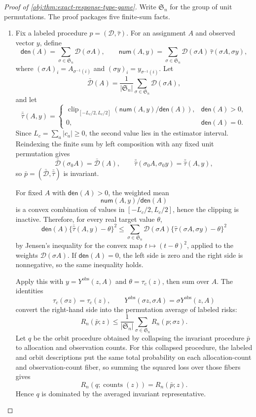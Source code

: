 \begin{proof}[Proof of \cref{obj:thm:exact-response-type-game}]
Write \(\mathfrak S_n\) for the group of unit permutations.  The proof packages five finite-sum facts.

\begin{enumerate}
\item Fix a labeled procedure \(p=(\mathcal D,\widehat\tau)\).  For an assignment \(A\) and observed vector \(y\), define
\[
\mathsf{den}(A)=\sum_{\sigma\in\mathfrak S_n}\mathcal D(\sigma A),
\qquad
\mathsf{num}(A,y)=
\sum_{\sigma\in\mathfrak S_n}\mathcal D(\sigma A)\,
\widehat\tau(\sigma A,\sigma y),
\]
where \((\sigma A)_i=A_{\sigma^{-1}(i)}\) and \((\sigma y)_i=y_{\sigma^{-1}(i)}\).  Let
\[
\bar{\mathcal D}(A)=\frac{1}{|\mathfrak S_n|}
\sum_{\sigma\in\mathfrak S_n}\mathcal D(\sigma A),
\]
and let
\[
\bar{\widehat\tau}(A,y)=
\begin{cases}
\operatorname{clip}_{[-L_c/2,L_c/2]}
\!\left(\mathsf{num}(A,y)/\mathsf{den}(A)\right),
& \mathsf{den}(A)>0,\\[2mm]
0,& \mathsf{den}(A)=0.
\end{cases}
\]
Since \(L_c=\sum_a |c_a|\ge 0\), the second value lies in the estimator interval.  Reindexing the finite sum by left composition with any fixed unit permutation gives
\[
\bar{\mathcal D}(\sigma_0 A)=\bar{\mathcal D}(A),
\qquad
\bar{\widehat\tau}(\sigma_0 A,\sigma_0 y)=\bar{\widehat\tau}(A,y),
\]
so \(\bar p=(\bar{\mathcal D},\bar{\widehat\tau})\) is invariant.

For fixed \(A\) with \(\mathsf{den}(A)>0\), the weighted mean
\[
\mathsf{num}(A,y)/\mathsf{den}(A)
\]
is a convex combination of values in \([-L_c/2,L_c/2]\), hence the clipping is inactive.  Therefore, for every real target value \(\theta\),
\[
\mathsf{den}(A)\{\bar{\widehat\tau}(A,y)-\theta\}^2
\le
\sum_{\sigma\in\mathfrak S_n}
\mathcal D(\sigma A)\{\widehat\tau(\sigma A,\sigma y)-\theta\}^2
\]
by Jensen's inequality for the convex map \(t\mapsto(t-\theta)^2\), applied to the weights \(\mathcal D(\sigma A)\).  If \(\mathsf{den}(A)=0\), the left side is zero and the right side is nonnegative, so the same inequality holds.

Apply this with \(y=Y^{\mathrm{obs}}(z,A)\) and \(\theta=\tau_c(z)\), then sum over \(A\).  The identities
\[
\tau_c(\sigma z)=\tau_c(z),
\qquad
Y^{\mathrm{obs}}(\sigma z,\sigma A)=
\sigma Y^{\mathrm{obs}}(z,A)
\]
convert the right-hand side into the permutation average of labeled risks:
\[
R_n(\bar p;z)
\le
\frac{1}{|\mathfrak S_n|}
\sum_{\sigma\in\mathfrak S_n}R_n(p;\sigma z).
\]
Let \(q\) be the orbit procedure obtained by collapsing the invariant procedure \(\bar p\) to allocation and observation counts.  For this collapsed procedure, the labeled and orbit descriptions put the same total probability on each allocation-count and observation-count fiber, so summing the squared loss over those fibers gives
\[
R_n(q;\operatorname{counts}(z))=R_n(\bar p;z).
\]
Hence \(q\) is dominated by the averaged invariant representative. %


\end{enumerate}
\end{proof}
